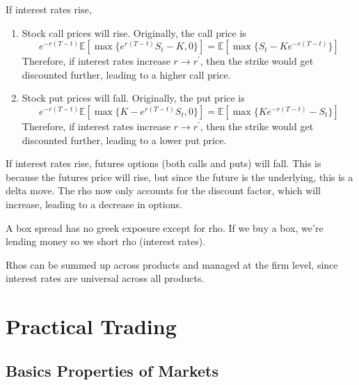 \documentclass{article}
\begin{document}
    \begin{theorem}
      If interest rates rise,
      \begin{enumerate}
        \item Stock call prices will rise. Originally, the call price is
        \begin{equation}
          e^{-r (T - t)} \mathbb{E}[\max\{e^{r(T - t)} S_t - K, 0\}] = \mathbb{E}[\max\{ S_t - K e^{-r (T - t)}\}]
        \end{equation}
        Therefore, if interest rates increase $r \rightarrow r^\prime$, then the strike would get discounted further, leading to a higher call price.

        \item Stock put prices will fall. Originally, the put price is
        \begin{equation}
          e^{-r (T - t)} \mathbb{E}[\max\{K - e^{r(T - t)} S_t, 0\}] = \mathbb{E}[\max\{K e^{-r (T - t)} - S_t\}]
        \end{equation}
        Therefore, if interest rates increase $r \rightarrow r^\prime$, then the strike would get discounted further, leading to a lower put price.
      \end{enumerate}
    \end{theorem}

    \begin{theorem}
      If interest rates rise, futures options (both calls and puts) will fall. This is because the futures price will rise, but since the future is the underlying, this is a delta move. The rho now only accounts for the discount factor, which will increase, leading to a decrease in options.
    \end{theorem}

    \begin{example}
      A box spread has no greek exposure except for rho. If we buy a box, we're lending money so we short rho (interest rates).
    \end{example}

    Rhos can be summed up across products and managed at the firm level, since interest rates are universal across all products.

\section{Practical Trading}

  \subsection{Basics Properties of Markets} 
\end{document}
